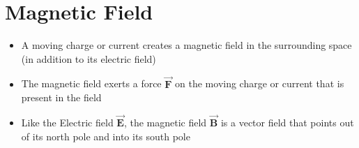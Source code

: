 \documentclass[11pt, a4paper]{article}
\begin{document}
\section[27.2 Magnetic Field]{Magnetic Field}
\begin{itemize}
    \item A moving charge or current creates a magnetic field in the surrounding space
        (in addition to its electric field)
    \item The magnetic field exerts a force $\vec{\mathbf{F}}$ on the moving charge or
        current that is present in the field
    \item Like the Electric field $\vec{\mathbf{E}}$, the magnetic field
        $\vec{\mathbf{B}}$ is a vector field that points out of its north pole and into
        its south pole
\end{itemize}
\end{document}
